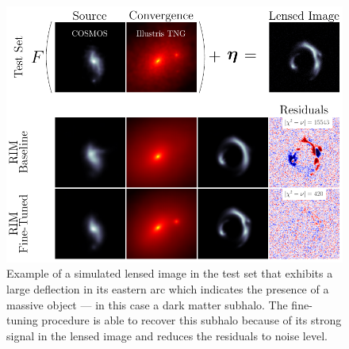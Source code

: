 \begin{figure}[tb!]
       \centering 
       \includegraphics[width=\linewidth]{figures/main_figurev2}
       \caption{Example of a simulated lensed image in the test set that 
exhibits a large deflection in its eastern arc which indicates the presence of a massive object
 --- in this case a dark matter subhalo. The fine-tuning procedure is able to recover 
this subhalo because of its strong signal in the lensed image and reduces the residuals 
to noise level.}
       \label{fig:main figure}
\end{figure}


